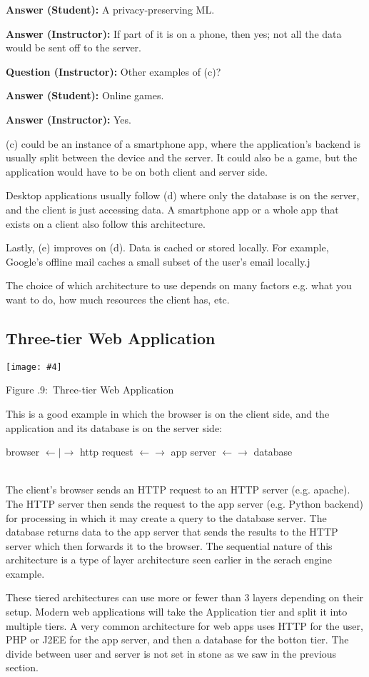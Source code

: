 \documentclass[twoside]{article}
\newcounter{lecnum}
\newcommand{\fig}[4]{
            \centerline{\texttt{[image: \#4]}}
            \begin{center}
            Figure \thelecnum.#1:~#3
            \end{center}
    }
\begin{document}
\textbf{Answer (Student): } A privacy-preserving ML.

\textbf{Answer (Instructor): } If part of it is on a phone, then yes; not all the data would be sent off to the server.

\textbf{Question (Instructor): } Other examples of (c)?

\textbf{Answer (Student): } Online games.

\textbf{Answer (Instructor): } Yes.

(c) could be an instance of a smartphone app, where the application's backend is usually split between the device and the server. It could also be a game, but the application would have to be on both client and server side. 

Desktop applications usually follow (d) where only the database is on the server, and the client is just accessing data. A smartphone app or a whole app that exists on a client also follow this architecture.

Lastly, (e) improves on (d). Data is cached or stored locally. For example, Google's offline mail caches a small subset of the user's email locally.j

The choice of which architecture to use depends on many factors e.g. what you want to do, how much resources the client has, etc.


\subsection{Three-tier Web Application}
\fig{9}{0.5}{Three-tier Web Application}{threetier.png}

This is a good example in which the browser is on the client side, and the application and its database is on the server side:\\
        \centerline{browser $\leftarrow | \rightarrow$ http request $\leftarrow\rightarrow$ app server $\leftarrow\rightarrow$ database }\\
        
The client's browser sends an HTTP request to an HTTP server (e.g. apache). The HTTP server then sends the request to the app server (e.g. Python backend) for processing in which it may create a query to the database server. The database returns data to the app server that sends the results to the HTTP server which then forwards it to the browser. The sequential nature of this architecture is a type of layer architecture seen earlier in the serach engine example.

These tiered architectures can use more or fewer than 3 layers depending on their setup. Modern web applications will take the Application tier and split it into multiple tiers. A very common architecture for web apps uses HTTP for the user, PHP or J2EE for the app server, and then a database for the botton tier. The divide between user and server is not set in stone as we saw in the previous section.
\end{document}
